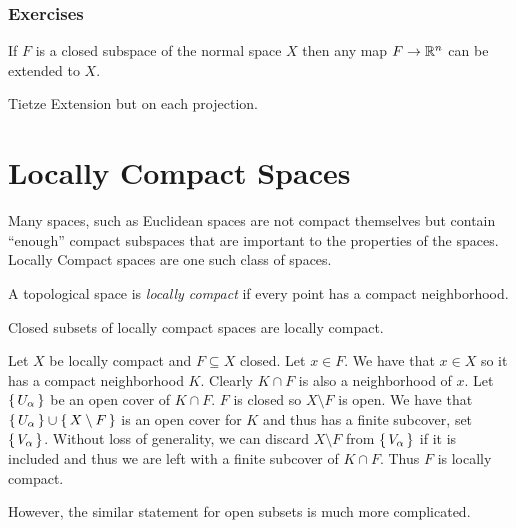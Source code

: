 \documentclass[letterpaper, 11pt, oneside]{book}
\begin{document}
\clearpage

\subsection*{Exercises}

\begin{exercise}
  If $F$ is a closed subspace of the normal space $X$ then any map $F \to \mathbb{R}^{n}$ can be extended to $X$.
\end{exercise}
\begin{pf}
  Tietze Extension but on each projection.
\end{pf}

\clearpage

\chapter{Locally Compact Spaces}

Many spaces, such as Euclidean spaces are not compact themselves but contain ``enough'' compact subspaces that are important to the properties of the spaces.
Locally Compact spaces are one such class of spaces.

\begin{defn}
  A topological space is \emph{locally compact} if every point has a compact neighborhood.
\end{defn}

\begin{prop}\label{prop: closed_subset_local_compact}
  Closed subsets of locally compact spaces are locally compact.
\end{prop}
\begin{pf}
  Let $X$ be locally compact and $F \subseteq X$ closed.
  Let $x \in F$.
  We have that $x \in X$ so it has a compact neighborhood $K$.
  Clearly $K \cap F$ is also a neighborhood of $x$.
  Let $\set{U_{\alpha}}$ be an open cover of $K \cap F$.
  $F$ is closed so $X \setminus F$ is open.
  We have that $\set{U_{\alpha}} \cup \set{X \setminus F}$ is an open cover for $K$ and thus has a finite subcover, set $\set{V_{\alpha}}$.
  Without loss of generality, we can discard $X \setminus F$ from $\set{V_{\alpha}}$ if it is included and thus we are left with a finite subcover of $K \cap F$.
  Thus $F$ is locally compact.
\end{pf}

However, the similar statement for open subsets is much more complicated.
\end{document}
